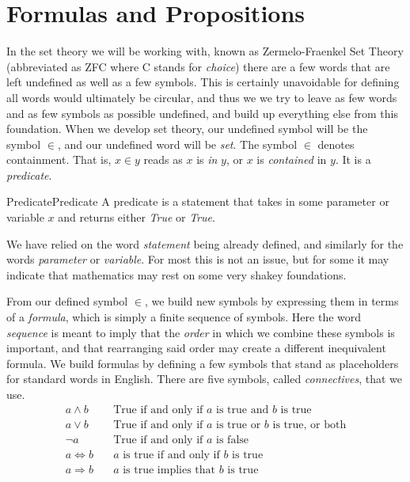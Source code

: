\section{Formulas and Propositions}
    In the set theory we will be working with, known as
    Zermelo-Fraenkel Set Theory (abbreviated as ZFC where C stands for
    \textit{choice}) there are a few words that are left undefined as well as a
    few symbols. This is certainly unavoidable for defining all words would
    ultimately be circular, and thus we we try to leave as few words and as few
    symbols as possible undefined, and build up everything else from this
    foundation. When we develop set theory, our undefined symbol will be
    the symbol $\in$, and our undefined word will be \textit{set}. The symbol
    $\in$ denotes containment. That is, $x\in{y}$ reads as $x$ is \textit{in}
    $y$, or $x$ is \textit{contained} in $y$. It is a
    \textit{\gls{predicate}}.
    \begin{fdefinition}{Predicate}{Predicate}
        A \gls{predicate} is a statement that takes in some parameter or
        variable $x$ and returns either \textit{True} or \textit{True}.
    \end{fdefinition}
    We have relied on the word \textit{statement} being already defined, and
    similarly for the words \textit{parameter} or \textit{variable}. For most
    this is not an issue, but for some it may indicate that mathematics may rest
    on some very shakey foundations.
    \par\hfill\par
    From our defined symbol $\in$, we build new symbols by expressing them in
    terms of a \textit{formula}, which is simply a finite
    sequence of symbols. Here the word \textit{sequence} is meant to imply that
    the \textit{order} in which we combine these symbols is important, and that
    rearranging said order may create a different inequivalent formula. We build
    formulas by defining a few symbols that stand as placeholders for standard
    words in English. There are five symbols, called
    \textit{\glspl{connective}}, that we use.
    \begin{align*}
        a\land{b}\quad
        &\textrm{True if and only if }a
        \textrm{ is true and }b\textrm{ is true}
        \tag{Conjunction}\\
        a\lor{b}\quad
        &\textrm{True if and only if }a
        \textrm{ is true or }b\textrm{ is true, or both}
        \tag{Disjunction}\\
        \neg{a}\quad
        &\textrm{True if and only if }a\textrm{ is false}
        \tag{Negation}\\
        a\Leftrightarrow{b}\quad
        &a\textrm{ is true if and only if }b\textrm{ is true}
        \tag{Equivalence}\\
        a\Rightarrow{b}\quad
        &a\textrm{ is true implies that }b\textrm{ is true}
        \tag{Implication}
    \end{align*}